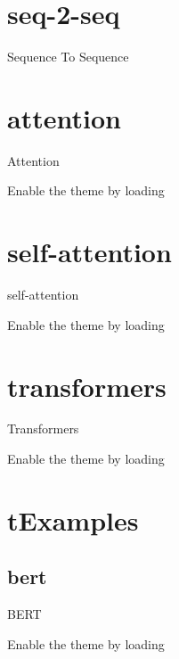 \documentclass[10pt]{beamer}
\begin{document}
\section[Sequence-to-sequence models]{seq-2-seq}

\begin{frame}[fragile]{Sequence To Sequence}


\end{frame}

\section[Attention]{attention}

\begin{frame}[fragile]{Attention}

	Enable the theme by loading

\end{frame}


\section[Self-Attention]{self-attention}

\begin{frame}[fragile]{self-attention}

	Enable the theme by loading

\end{frame}


\section[Transformers]{transformers}

\begin{frame}[fragile]{Transformers}

	Enable the theme by loading

\end{frame}

\section[TransformerExamples]{tExamples}

\subsection[BERT]{bert}

\begin{frame}[fragile]{BERT}

	Enable the theme by loading

\end{frame}
\end{document}
